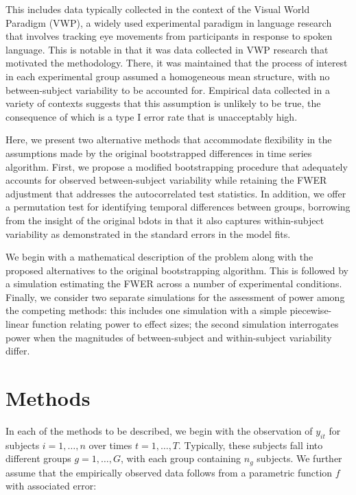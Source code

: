 This includes data typically collected in the context of the Visual World Paradigm (VWP), a widely used experimental paradigm in language research that involves tracking eye movements from participants in response to spoken language. This is notable in that it was data collected in VWP research that motivated the  methodology. There, it was maintained that the process of interest in each experimental group assumed a homogeneous mean structure, with no between-subject variability to be accounted for. Empirical data collected in a variety of contexts suggests that this assumption is unlikely to be true, the consequence of which is a type I error rate that is unacceptably high. 



Here, we present two alternative methods that accommodate flexibility in the assumptions made by the original bootstrapped differences in time series algorithm. First, we propose a modified bootstrapping procedure that adequately accounts for observed between-subject variability while retaining the FWER adjustment that addresses the autocorrelated test statistics. In addition, we offer a permutation test for identifying temporal differences between groups, borrowing from the insight of the original bdots in that it also captures within-subject variability as demonstrated in the standard errors in the model fits.

We begin with a mathematical description of the problem along with the proposed alternatives to the original bootstrapping algorithm. This is followed by a simulation estimating the FWER across a number of experimental conditions. Finally, we consider two separate simulations for the assessment of power among the competing methods: this includes one simulation with a simple piecewise-linear function relating power to effect sizes; the second simulation interrogates power when the magnitudes of between-subject and within-subject variability differ. 


\section{Methods}

In each of the methods to be described, we begin with the observation of $y_{it}$ for subjects $i = 1, \dots, n$ over times $t = 1, \dots, T$. Typically, these subjects fall into different groups $g = 1, \dots, G$, with each group containing $n_g$ subjects. We further assume that the empirically observed data follows from a parametric function $f$ with associated error:


